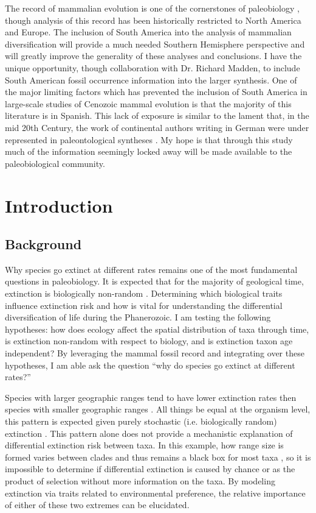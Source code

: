 \documentclass[11pt,letterpaper]{article}
\begin{document}
The record of mammalian evolution is one of the cornerstones of paleobiology \citep{Simpson1944}, though analysis of this record has been historically restricted to North America and Europe. The inclusion of South America into the analysis of mammalian diversification will provide a much needed Southern Hemisphere perspective and will greatly improve the generality of these analyses and conclusions. I have the unique opportunity, though collaboration with Dr. Richard Madden, to include South American fossil occurrence information into the larger synthesis. One of the major limiting factors which has prevented the inclusion of South America in large-scale studies of Cenozoic mammal evolution is that the majority of this literature is in Spanish. This lack of exposure is similar to the lament that, in the mid 20th Century, the work of continental authors writing in German were under represented in paleontological syntheses \citep{Gould1979a}. My hope is that through this study much of the information seemingly locked away will be made available to the paleobiological community.


\section{Introduction}
\subsection{Background}
Why species go extinct at different rates remains one of the most fundamental questions in paleobiology. It is expected that for the majority of geological time, extinction is biologically non-random \citep{Jablonski1986,Alexander1977,Harnik2011,Johnson2002b,Kitchell1986,Nurnberg2013a,Payne2007}. Determining which biological traits influence extinction risk and how is vital for understanding the differential diversification of life during the Phanerozoic. I am testing the following hypotheses: how does ecology affect the spatial distribution of taxa through time, is extinction non-random with respect to biology, and is extinction taxon age independent? By leveraging the mammal fossil record and integrating over these hypotheses, I am able ask the question ``why do species go extinct at different rates?''

Species with larger geographic ranges tend to have lower extinction rates then species with smaller geographic ranges \citep{Jablonski1986,Harnik2013,Nurnberg2013a,Jablonski2003,Roy2009c}. All things be equal at the organism level, this pattern is expected given purely stochastic (i.e. biologically random) extinction \citep{Raup1991b}. This pattern alone does not provide a mechanistic explanation of differential extinction risk between taxa. In this example, how range size is formed varies between clades and thus remains a black box for most taxa \citep{Jablonski1987}, so it is impossible to determine if differential extinction is caused by chance or as the product of selection without more information on the taxa. By modeling extinction via traits related to environmental preference, the relative importance of either of these two extremes can be elucidated.
\end{document}
